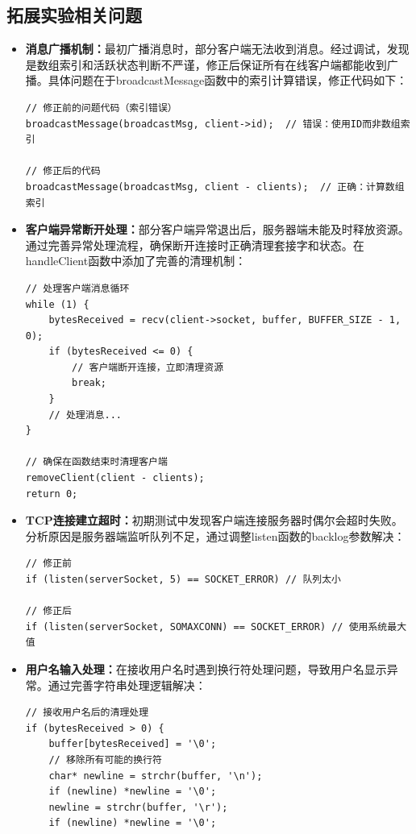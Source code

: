 \documentclass[a4paper]{article}
\begin{document}
\subsection{拓展实验相关问题}
\begin{itemize}
    \item \textbf{消息广播机制：}最初广播消息时，部分客户端无法收到消息。经过调试，发现是数组索引和活跃状态判断不严谨，修正后保证所有在线客户端都能收到广播。具体问题在于broadcastMessage函数中的索引计算错误，修正代码如下：
    
    \begin{verbatim}
// 修正前的问题代码（索引错误）
broadcastMessage(broadcastMsg, client->id);  // 错误：使用ID而非数组索引

// 修正后的代码
broadcastMessage(broadcastMsg, client - clients);  // 正确：计算数组索引
    \end{verbatim}
    
    \item \textbf{客户端异常断开处理：}部分客户端异常退出后，服务器端未能及时释放资源。通过完善异常处理流程，确保断开连接时正确清理套接字和状态。在handleClient函数中添加了完善的清理机制：
    
    \begin{verbatim}
// 处理客户端消息循环
while (1) {
    bytesReceived = recv(client->socket, buffer, BUFFER_SIZE - 1, 0);
    if (bytesReceived <= 0) {
        // 客户端断开连接，立即清理资源
        break;
    }
    // 处理消息...
}

// 确保在函数结束时清理客户端
removeClient(client - clients);
return 0;
    \end{verbatim}
    
    \item \textbf{TCP连接建立超时：}初期测试中发现客户端连接服务器时偶尔会超时失败。分析原因是服务器端监听队列不足，通过调整listen函数的backlog参数解决：
    
    \begin{verbatim}
// 修正前
if (listen(serverSocket, 5) == SOCKET_ERROR) // 队列太小

// 修正后  
if (listen(serverSocket, SOMAXCONN) == SOCKET_ERROR) // 使用系统最大值
    \end{verbatim}
    
    \item \textbf{用户名输入处理：}在接收用户名时遇到换行符处理问题，导致用户名显示异常。通过完善字符串处理逻辑解决：
    
    \begin{verbatim}
// 接收用户名后的清理处理
if (bytesReceived > 0) {
    buffer[bytesReceived] = '\0';
    // 移除所有可能的换行符
    char* newline = strchr(buffer, '\n');
    if (newline) *newline = '\0';
    newline = strchr(buffer, '\r');
    if (newline) *newline = '\0';
    

\end{verbatim}
\end{itemize}
\end{document}
